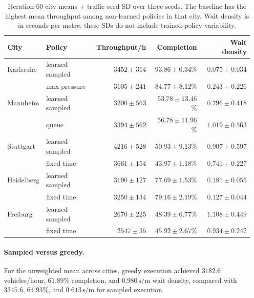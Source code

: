 \documentclass[10pt,a4paper]{article}
\begin{document}
\clearpage
\begin{table}[H]
  \footnotesize
  \centering
  \caption{Iteration-60 city means \(\pm\) traffic-seed SD over three seeds. The baseline has the highest mean throughput among non-learned policies in that city. Wait density is in seconds per metre; these SDs do not include trained-policy variability.}
  \begin{tabular}{@{}llrrr@{}}
    \toprule
    City & Policy & Throughput/h & Completion & Wait density\\
    \midrule
    Karlsruhe & learned sampled & \(3452\pm314\) & \(93.86\pm0.34\)\% & \(0.075\pm0.034\)\\
               & max pressure & \(3105\pm241\) & \(84.77\pm8.12\)\% & \(0.243\pm0.226\)\\
    Mannheim & learned sampled & \(3200\pm563\) & \(53.78\pm13.46\)\% & \(0.796\pm0.418\)\\
              & queue & \(3394\pm562\) & \(56.78\pm11.96\)\% & \(1.019\pm0.563\)\\
    Stuttgart & learned sampled & \(4216\pm528\) & \(50.93\pm9.13\)\% & \(0.907\pm0.597\)\\
               & fixed time & \(3661\pm154\) & \(43.97\pm1.18\)\% & \(0.741\pm0.227\)\\
    Heidelberg & learned sampled & \(3190\pm127\) & \(77.69\pm1.53\)\% & \(0.181\pm0.055\)\\
                & fixed time & \(3250\pm134\) & \(79.16\pm2.19\)\% & \(0.127\pm0.044\)\\
    Freiburg & learned sampled & \(2670\pm225\) & \(48.39\pm6.77\)\% & \(1.108\pm0.449\)\\
              & fixed time & \(2547\pm35\) & \(45.92\pm2.67\)\% & \(0.934\pm0.242\)\\
    \bottomrule
  \end{tabular}
  \label{tab:city-detail}
\end{table}

\paragraph{Sampled versus greedy.}
For the unweighted mean across cities, greedy execution achieved \(3182.6\) vehicles/hour, \(61.89\%\) completion, and \(0.980\,\mathrm{s/m}\) wait density, compared with \(3345.6\), \(64.93\%\), and \(0.613\,\mathrm{s/m}\) for sampled execution.
\end{document}
